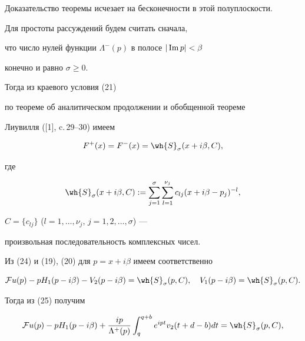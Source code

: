 \begin{pf*}{Доказательство теоремы}
исчезает на бесконечности в этой полуплоскости.





Для простоты рассуждений будем считать сначала,


что число нулей функции $\Lambda^-(p)$ в полосе $|\operatorname{Im} p|<\beta$


конечно и равно $\sigma\geq 0$.


Тогда из краевого условия (21)


по теореме об аналитическом продолжении и обобщенной теореме


Лиувилля ([1], c.\,29--30) имеем


\begin{equation}


F^+(x)=F^-(x)=\wh{S}_\sigma (x+i\beta,C),


\end{equation}


где


$$


\wh{S}_\sigma(x+i\beta,C):=\sum _{j=1}^{\sigma}


\sum_{l=1}^{\nu_j}c_{lj}(x+i\beta-p_j)^{-l},


$$


$C=\{c_{lj}\}$ ($l=1,\dotsc,\nu_j$, $j=1,2,\dotsc,\sigma$) ---


произвольная последовательность комплексных чисел.





Из (24) и (19), (20) для $p=x+i\beta$ имеем соответственно


\begin{equation}


{\cal F}u(p)-pH_1(p-i\beta)-V_2(p-i\beta)=\wh{S}_\sigma(p,C),


\quad V_1(p-i\beta)=\wh{S}_\sigma(p,C).


\end{equation}


Тогда из (25) получим


\begin{equation}


\begin{split}


{\cal F}u(p)-pH_1(p-i\beta)+ \frac{ip}


{\Lambda^+(p)}\int_{q}^{q+b}


e^{ipt}v_2(t+d-b)dt &=\wh{S}_\sigma(p,C), \\


%



\end{split}
\end{equation}
\end{pf*}
